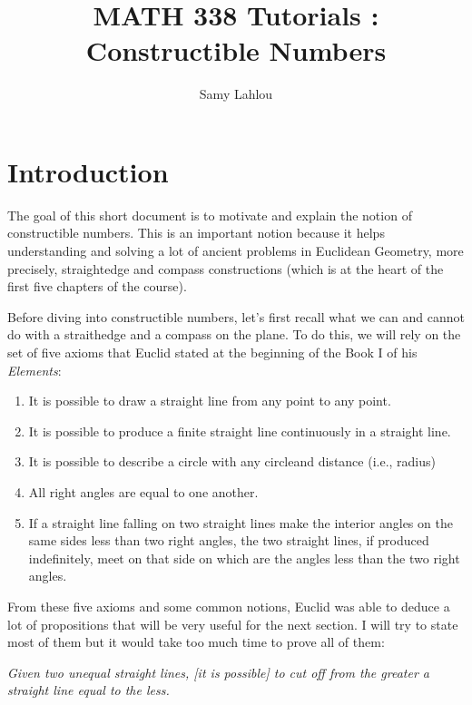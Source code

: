 \documentclass{article}
\title{MATH 338 Tutorials : Constructible Numbers}
\author{Samy Lahlou}
\date{}
\theoremstyle{plain}
\theoremstyle{definition}
\newenvironment{customthm}[1]
  {\renewcommand\theinnercustomthm{#1}\innercustomthm}
  {\endinnercustomthm}
\begin{document}
\maketitle

\section*{Introduction}

The goal of this short document is to motivate and explain the notion of constructible numbers. This is an important notion because it helps understanding and solving a lot of ancient problems in Euclidean Geometry, more precisely, straightedge and compass constructions (which is at the heart of the first five chapters of the course).

Before diving into constructible numbers, let's first recall what we can and cannot do with a straithedge and a compass on the plane. To do this, we will rely on the set of five axioms that Euclid stated at the beginning of the Book I of his \textit{Elements}:

\begin{enumerate}[label=\textbf{A\arabic*.}]
    \item It is possible to draw a straight line from any point to any point.
    \item It is possible to produce a finite straight line continuously in a straight line.
    \item It is possible to describe a circle with any circleand distance (i.e., radius)
    \item All right angles are equal to one another.
    \item If a straight line falling on two straight lines make the interior angles on the same sides less than two right angles, the two straight lines, if produced indefinitely, meet on that side on which are the angles less than the two right angles.
\end{enumerate}

From these five axioms and some common notions, Euclid was able to deduce a lot of propositions that will be very useful for the next section. I will try to state most of them but it would take too much time to prove all of them:

\begin{customthm}{I.3}\label{1.3}
    \textit{Given two unequal straight lines, [it is possible] to cut off from the greater a straight line equal to the less.}
\end{customthm}
\end{document}
